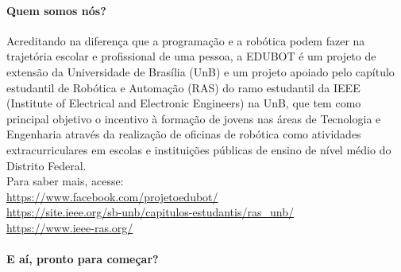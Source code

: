 \paragraph{Quem somos nós?} Acreditando na diferença que a programação e a robótica podem fazer na trajetória escolar e profissional de uma pessoa, a EDUBOT é um projeto de extensão da Universidade de Brasília (UnB) e um projeto apoiado pelo capítulo estudantil de Robótica e Automação (RAS) do ramo estudantil da IEEE (Institute of Electrical and Electronic Engineers) na UnB, que tem como principal objetivo o incentivo à formação de jovens nas áreas de Tecnologia e Engenharia através da realização de oficinas de robótica como atividades extracurriculares em escolas e instituições públicas de ensino de nível médio do Distrito Federal. \\
Para saber mais, acesse: \\
\url{https://www.facebook.com/projetoedubot/} \\
\url{ https://site.ieee.org/sb-unb/capitulos-estudantis/ras_unb/}\\
\url{https://www.ieee-ras.org/} 
\paragraph{E aí, pronto para começar?}


